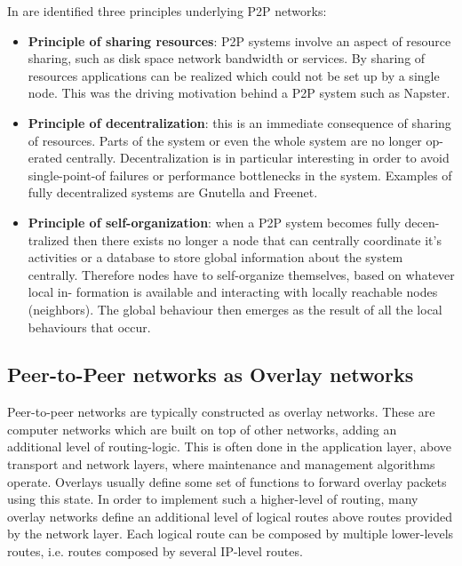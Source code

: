 In \cite{Aberer02anoverview} are identified three principles underlying P2P networks:
\begin{itemize}
\item  \textbf{Principle of sharing resources}: P2P systems involve an aspect of resource sharing, such as disk space network bandwidth or services. By sharing of resources applications can be realized which could not be set up by a single node. This was the driving motivation
behind a P2P system such as Napster.
\item \textbf{Principle of decentralization}: this is an immediate consequence of sharing
of resources. Parts of the system or even the whole system are no longer op-
erated centrally. Decentralization is in particular interesting in order to avoid
single-point-of failures or performance bottlenecks in the system. Examples
of fully decentralized systems are Gnutella and Freenet.
\item \textbf{Principle of self-organization}: when a P2P system becomes fully decen-
tralized then there exists no longer a node that can centrally coordinate it’s
activities or a database to store global information about the system centrally.
Therefore nodes have to self-organize themselves, based on whatever local in-
formation is available and interacting with locally reachable nodes (neighbors).
The global behaviour then emerges as the result of all the local behaviours
that occur.

\end{itemize}




\subsection{Peer-to-Peer networks as Overlay networks}
Peer-to-peer networks are typically constructed as overlay networks. These are computer networks which are built on top of other networks, adding an additional level of routing-logic. This is often done in the application layer, above transport and network layers, where maintenance and management algorithms operate. Overlays usually define some set of functions to forward overlay packets using this state. In order to implement such a higher-level of routing, many overlay networks define an additional level of logical routes above routes provided by the network layer. Each logical route can be composed by multiple lower-levels routes, i.e. routes composed by several IP-level routes.
\\

